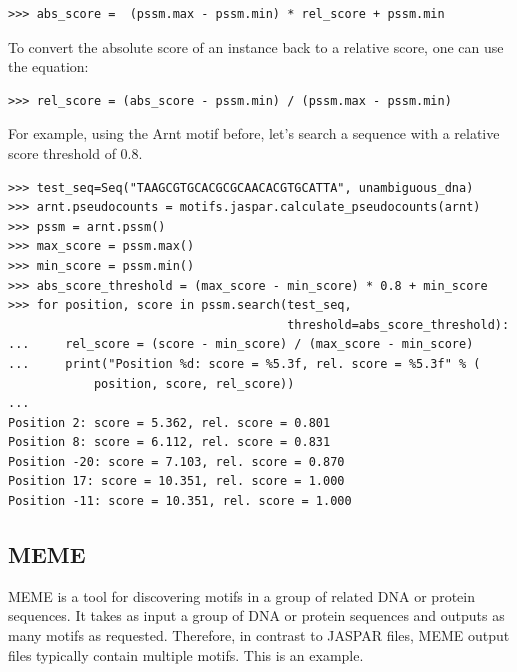 \documentclass{report}
\begin{document}
\begin{itemize}
\begin{verbatim}
>>> abs_score =  (pssm.max - pssm.min) * rel_score + pssm.min
\end{verbatim}
To convert the absolute score of an instance back to a relative score, one can use the equation:
\begin{verbatim}
>>> rel_score = (abs_score - pssm.min) / (pssm.max - pssm.min)
\end{verbatim}
For example, using the Arnt motif before, let's search a sequence with a relative score threshold of 0.8.
\begin{verbatim}
>>> test_seq=Seq("TAAGCGTGCACGCGCAACACGTGCATTA", unambiguous_dna)
>>> arnt.pseudocounts = motifs.jaspar.calculate_pseudocounts(arnt) 
>>> pssm = arnt.pssm()
>>> max_score = pssm.max()
>>> min_score = pssm.min()
>>> abs_score_threshold = (max_score - min_score) * 0.8 + min_score
>>> for position, score in pssm.search(test_seq,
                                       threshold=abs_score_threshold):
...     rel_score = (score - min_score) / (max_score - min_score)
...     print("Position %d: score = %5.3f, rel. score = %5.3f" % (
            position, score, rel_score))
... 
Position 2: score = 5.362, rel. score = 0.801
Position 8: score = 6.112, rel. score = 0.831
Position -20: score = 7.103, rel. score = 0.870
Position 17: score = 10.351, rel. score = 1.000
Position -11: score = 10.351, rel. score = 1.000
\end{verbatim}
\end{itemize}

\subsection{MEME}

MEME \cite{bailey1994} is a tool for discovering motifs in a group of related
DNA or protein sequences. It takes as input a group of DNA or protein sequences 
and outputs as many motifs as requested. Therefore, in contrast to JASPAR
files, MEME output files typically contain multiple motifs. This is an example.
\end{document}
